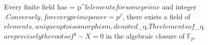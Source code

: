 Every finite field has  = p^f$ elements for some prime $ and integer  $. Conversely, for every prime power  = p^f$, there exists a field of $ elements, unique up to isomorphism, denoted $_q$. The elements of $_q$ are precisely the roots of ^q - X = 0$ in the algebraic closure of $\mathbb{F}_p$.
